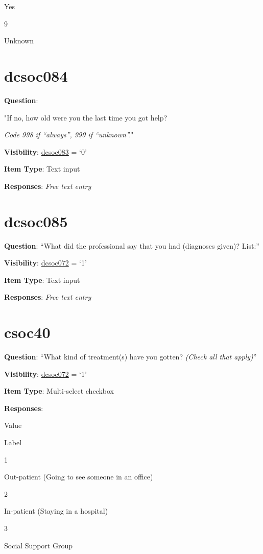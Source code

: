\documentclass[]{book}
\begin{document}
Yes

9

Unknown

\hypertarget{dcsoc084}{%
\section{dcsoc084}\label{dcsoc084}}

\textbf{Question}:

"If no, how old were you the last time you got help?

\emph{Code 998 if ``always'', 999 if ``unknown''.}"

\textbf{Visibility}: \protect\hyperlink{dcsoc083}{dcsoc083} = `0'

\textbf{Item Type}: Text input

\textbf{Responses}: \emph{Free text entry}

\hypertarget{dcsoc085}{%
\section{dcsoc085}\label{dcsoc085}}

\textbf{Question}: ``What did the professional say that you had (diagnoses given)? List:''

\textbf{Visibility}: \protect\hyperlink{dcsoc072}{dcsoc072} = `1'

\textbf{Item Type}: Text input

\textbf{Responses}: \emph{Free text entry}

\hypertarget{csoc40}{%
\section{csoc40}\label{csoc40}}

\textbf{Question}: ``What kind of treatment(s) have you gotten? \emph{(Check all that apply)}''

\textbf{Visibility}: \protect\hyperlink{dcsoc072}{dcsoc072} = `1'

\textbf{Item Type}: Multi-select checkbox

\textbf{Responses}:

Value

Label

1

Out-patient (Going to see someone in an office)

2

In-patient (Staying in a hospital)

3

Social Support Group
\end{document}
